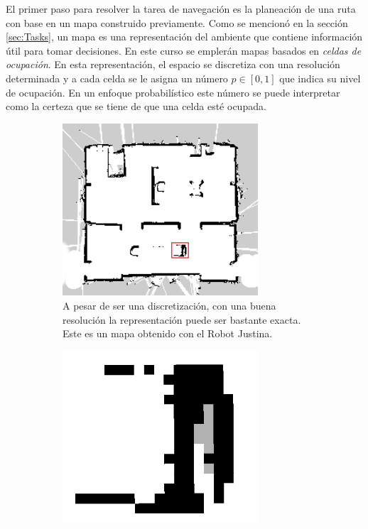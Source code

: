 \documentclass[a4paper]{article}
\begin{document}
El primer paso para resolver la tarea de navegación es la planeación de una ruta con base en un mapa construido previamente. Como se mencionó en la sección \ref{sec:Tasks}, un mapa es una representación del ambiente que contiene información útil para tomar decisiones. En este curso se emplerán mapas basados en \textit{celdas de ocupación}. En esta representación, el espacio se discretiza con una resolución determinada y a cada celda se le asigna un número $p\in[0,1]$ que indica su nivel de ocupación. En un enfoque probabilístico este número se puede interpretar como la certeza que se tiene de que una celda esté ocupada. 
\begin{figure}
  \centering
  \begin{subfigure}{0.4\textwidth}
    \centering
    \includegraphics[width=0.8\textwidth]{Figures/OccupancyGrid.png}
    \caption{A pesar de ser una discretización, con una buena resolución la representación puede ser bastante exacta. Este es un mapa obtenido con el Robot Justina.}
  \end{subfigure}
  \hspace{0.05\textwidth}
  \begin{subfigure}{0.4\textwidth}
    \centering
    \includegraphics[width=0.8\textwidth]{Figures/UniversumZoom.png}

\end{subfigure}
\end{figure}
\end{document}
